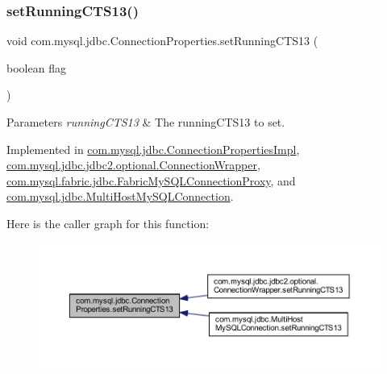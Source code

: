 \subsubsection{\texorpdfstring{set\+Running\+C\+T\+S13()}{setRunningCTS13()}}
{\footnotesize\ttfamily void com.\+mysql.\+jdbc.\+Connection\+Properties.\+set\+Running\+C\+T\+S13 (\begin{DoxyParamCaption}\item[{boolean}]{flag }\end{DoxyParamCaption})}


\begin{DoxyParams}{Parameters}
{\em running\+C\+T\+S13} & The running\+C\+T\+S13 to set. \\
\hline
\end{DoxyParams}


Implemented in \mbox{\hyperlink{classcom_1_1mysql_1_1jdbc_1_1_connection_properties_impl_abf878845b942c7f66f05ba71c9075663}{com.\+mysql.\+jdbc.\+Connection\+Properties\+Impl}}, \mbox{\hyperlink{classcom_1_1mysql_1_1jdbc_1_1jdbc2_1_1optional_1_1_connection_wrapper_a7a84fadba26631fe6770c399ab0a5e8a}{com.\+mysql.\+jdbc.\+jdbc2.\+optional.\+Connection\+Wrapper}}, \mbox{\hyperlink{classcom_1_1mysql_1_1fabric_1_1jdbc_1_1_fabric_my_s_q_l_connection_proxy_a3e401de958f968fb292eb8e882008020}{com.\+mysql.\+fabric.\+jdbc.\+Fabric\+My\+S\+Q\+L\+Connection\+Proxy}}, and \mbox{\hyperlink{classcom_1_1mysql_1_1jdbc_1_1_multi_host_my_s_q_l_connection_a10d268ef01a38535c6b99a9d038bb0db}{com.\+mysql.\+jdbc.\+Multi\+Host\+My\+S\+Q\+L\+Connection}}.

Here is the caller graph for this function\+:\nopagebreak
\begin{figure}[H]
\begin{center}
\leavevmode
\includegraphics[width=350pt]{interfacecom_1_1mysql_1_1jdbc_1_1_connection_properties_abb37aa2ea5dd29021d40a76b33b82939_icgraph}
\end{center}
\end{figure}
\mbox{\label{interfacecom_1_1mysql_1_1jdbc_1_1_connection_properties_aebbbaaab658a9df1fd2af21e9c3ccbf5}} 
